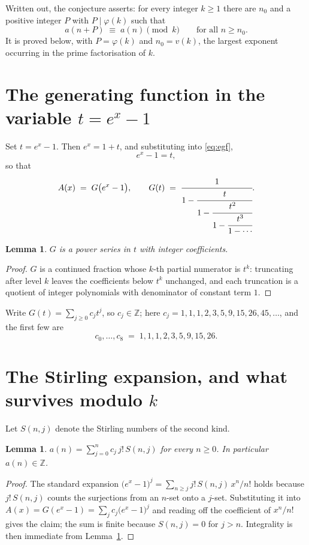 \documentclass[11pt,a4paper]{article}
\theoremstyle{plain}
\newtheorem{lemma}[theorem]{Lemma}
\theoremstyle{definition}
\begin{document}
Written out, the conjecture asserts: for every integer $k\ge 1$ there are $n_0$ and a
positive integer $P$ with $P\mid\varphi(k)$ such that
\begin{equation}\label{eq:conj}
a(n+P)\;\equiv\;a(n)\pmod{k}\qquad\text{for all } n\ge n_0 .
\end{equation}
It is proved below, with $P=\varphi(k)$ and $n_0=v(k)$, the largest exponent occurring in
the prime factorisation of $k$.

\section{The generating function in the variable $t=e^{x}-1$}

Set $t=e^{x}-1$. Then $e^{x}=1+t$, and substituting into \eqref{eq:egf},
\[
e^{x}-1=t,
\]
so that
\begin{equation}\label{eq:G}
A(x)\;=\;G\bigl(e^{x}-1\bigr),\qquad
G(t)\;=\;\cfrac{1}{1-\cfrac{t}{1-\cfrac{t^{2}}{1-\cfrac{t^{3}}{1-\cdots}}}}.
\end{equation}

\begin{lemma}\label{lem:int}
$G$ is a power series in $t$ with integer coefficients.
\end{lemma}

\begin{proof}
$G$ is a continued fraction whose $k$-th partial numerator is $t^{k}$: truncating after level $k$ leaves the coefficients below $t^{k}$ unchanged, and each truncation is a quotient of integer polynomials with denominator of constant term $1$.
\end{proof}

Write $G(t)=\sum_{j\ge0}c_j t^{j}$, so $c_j\in\mathbb{Z}$; here $c_j = 1, 1, 1, 2, 3, 5, 9, 15, 26, 45, \dots$, and the
first few are
\[
c_0,\dots,c_8 \;=\; 1, 1, 1, 2, 3, 5, 9, 15, 26.
\]

\section{The Stirling expansion, and what survives modulo $k$}

Let $S(n,j)$ denote the Stirling numbers of the second kind.

\begin{lemma}\label{lem:stir}
$a(n)=\sum_{j=0}^{n} c_j\, j!\, S(n,j)$ for every $n\ge 0$. In particular $a(n)\in\mathbb{Z}$.
\end{lemma}

\begin{proof}
The standard expansion $\bigl(e^{x}-1\bigr)^{j}
=\sum_{n\ge j} j!\,S(n,j)\,x^{n}/n!$ holds because $j!\,S(n,j)$ counts the surjections
from an $n$-set onto a $j$-set. Substituting it into
$A(x)=G(e^{x}-1)=\sum_j c_j\bigl(e^{x}-1\bigr)^{j}$ and reading off the coefficient of
$x^{n}/n!$ gives the claim; the sum is finite because $S(n,j)=0$ for $j>n$. Integrality is
then immediate from Lemma~\ref{lem:int}.
\end{proof}
\end{document}
